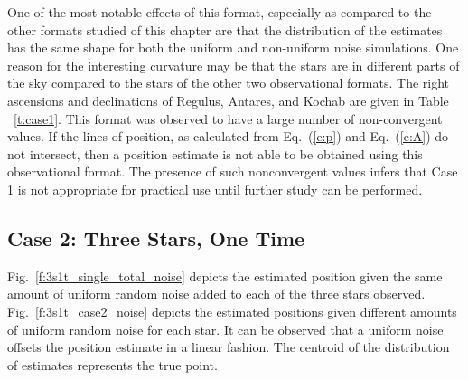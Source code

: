 \documentclass[12pt,a4paper]{book}
\begin{document}
One of the most notable effects of this format, especially as compared to the other formats studied of this chapter are that the distribution of the estimates has the same shape for both the uniform and non-uniform noise simulations.  One reason for the interesting curvature may be that the stars are in different parts of the sky compared to the stars of the other two observational formats.  The right ascensions and declinations of Regulus, Antares, and Kochab are given in Table ~\ref{t:case1}.  This format was observed to have a large number of non-convergent values. If the lines of position, as calculated from Eq.~(\ref{e:p}) and Eq.~(\ref{e:A}) do not intersect, then a position estimate is not able to be obtained using this observational format.  The presence of such nonconvergent values infers that Case 1 is not appropriate for practical use until further study can be performed.

\FloatBarrier
\subsection*{Case 2: Three Stars, One Time}
\FloatBarrier
Fig.~\ref{f:3s1t_single_total_noise} depicts the estimated position given the same amount of uniform random noise added to each of the three stars observed.  Fig.~\ref{f:3s1t_case2_noise} depicts the estimated positions given different amounts of uniform random noise for each star.  It can be observed that a uniform noise offsets the position estimate in a linear fashion.  The centroid of the distribution of estimates represents the true point.
\end{document}
